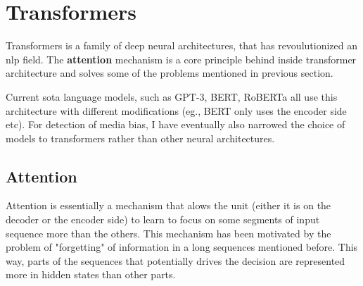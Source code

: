\section{Transformers}\label{att_transformers}
Transformers is a family of deep neural architectures, that has revoulutionized an \gls{nlp} field. The \textbf{attention} mechanism is a core principle behind inside transformer architecture and solves some of the problems mentioned in previous section.

Current \gls{sota} language models, such as GPT-3, BERT, RoBERTa all use this architecture with different modifications (eg., BERT only uses the encoder side etc). For detection of media bias, I have eventually also narrowed the choice of models to transformers rather than other neural architectures.



\subsection{Attention}
Attention \cite{bahdanau2014neural,luongeffective} is essentially a mechanism that alows the unit (either it is on the decoder or the encoder side) to learn to focus on some segments of input sequence more than the others. This mechanism has been motivated by the problem of "forgetting" of information in a long sequences mentioned before. This way, parts of the sequences that potentially drives the decision are represented more in hidden states than other parts.

